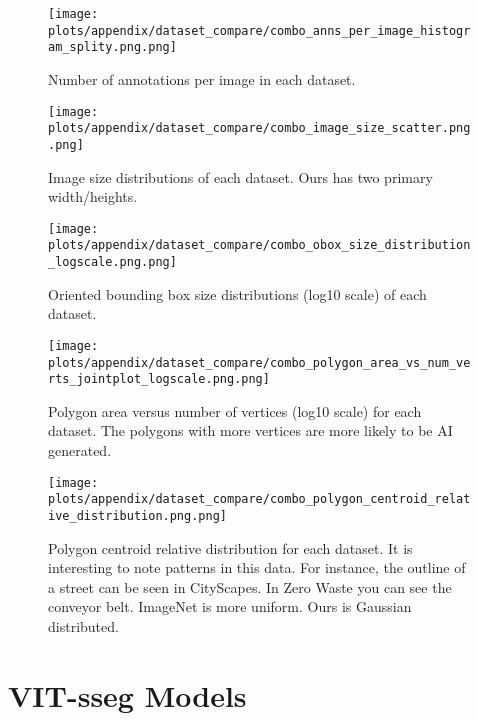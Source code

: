 \begin{figure*}[ht]
\centering
\texttt{[image: plots/appendix/dataset\_compare/combo\_anns\_per\_image\_histogram\_splity.png.png]}
\caption[]{
    Number of annotations per image in each dataset.
}
\label{fig:combo_anns_per_image_histogram_splity}
\end{figure*}


\begin{figure*}[ht]
\centering
\texttt{[image: plots/appendix/dataset\_compare/combo\_image\_size\_scatter.png.png]}
\caption[]{
    Image size distributions of each dataset. 
    Ours has two primary width/heights.
}
\label{fig:combo_image_size_scatter}
\end{figure*}


\begin{figure*}[ht]
\centering
\texttt{[image: plots/appendix/dataset\_compare/combo\_obox\_size\_distribution\_logscale.png.png]}
\caption[]{
    Oriented bounding box size distributions (log10 scale) of each dataset.
}
\label{fig:combo_obox_size_distribution_logscale}
\end{figure*}

\begin{figure*}[ht]
\centering
\texttt{[image: plots/appendix/dataset\_compare/combo\_polygon\_area\_vs\_num\_verts\_jointplot\_logscale.png.png]}
\caption[]{
    Polygon area versus number of vertices (log10 scale) for each dataset.
    The polygons with more vertices are more likely to be AI generated.
}
\label{fig:combo_polygon_area_vs_num_verts_jointplot}
\end{figure*}

\begin{figure*}[ht]
\centering
\texttt{[image: plots/appendix/dataset\_compare/combo\_polygon\_centroid\_relative\_distribution.png.png]}
\caption[]{
    Polygon centroid relative distribution for each dataset. It is interesting
    to note patterns in this data. For instance, the outline of a street can be
    seen in CityScapes. In Zero Waste you can see the conveyor belt. ImageNet
    is more uniform. Ours is Gaussian distributed. 
}
\label{fig:combo_polygon_centroid_relative_distribution}
\end{figure*}


\section{VIT-sseg Models}
\label{sec:vit_models}

